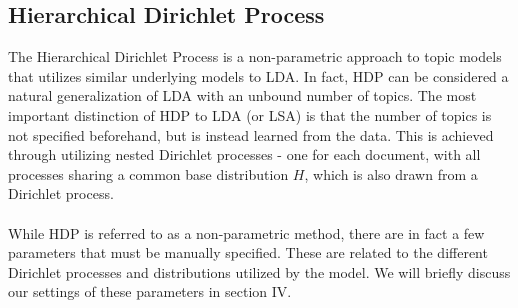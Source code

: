 \subsection{Hierarchical Dirichlet Process}

The Hierarchical Dirichlet Process is a non-parametric approach to topic models that utilizes similar underlying models to LDA. In fact, HDP can be considered a natural generalization of LDA with an unbound number of topics. The most important distinction of HDP to LDA (or LSA) is that the number of topics is not specified beforehand, but is instead learned from the data. This is achieved through utilizing nested Dirichlet processes - one for each document, with all processes sharing a common base distribution $H$, which is also drawn from a Dirichlet process\cite{HDP_paper}. \\\\
While HDP is referred to as a non-parametric method, there are in fact a few parameters that must be manually specified. These are related to the different Dirichlet processes and distributions utilized by the model. We will briefly discuss our settings of these parameters in section IV.